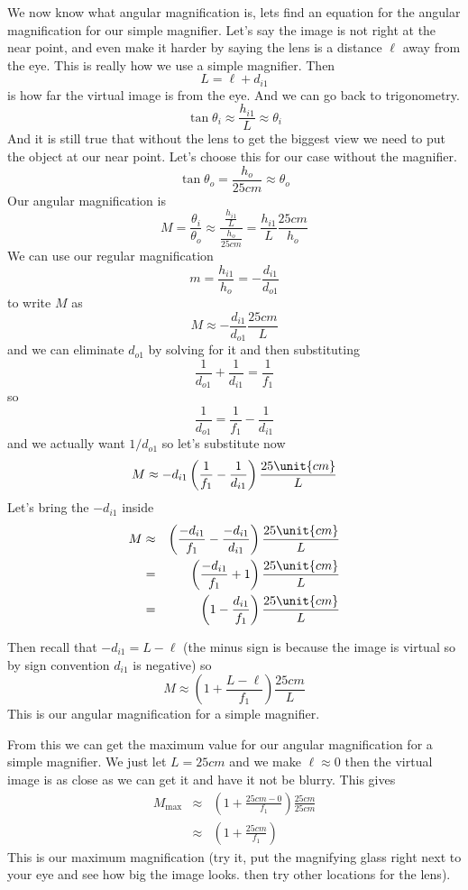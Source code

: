 \documentclass{article}
\begin{document}
We now know what angular magnification is, lets find an equation for the
angular magnification for our simple magnifier. Let's say the image is not right
at the near point, and even make it harder by saying the lens is a distance $%
\ell $ away from the eye. This is really how we use a simple magnifier. Then%
\[
L=\ell +d_{i1}
\]%
is how far the virtual image is from the eye. And we can go back to
trigonometry. 
\[
\tan \theta _{i}\approx \frac{h_{i1}}{L}\approx \theta _{i}
\]%
And it is still true that without the lens to get the biggest view we need
to put the object at our near point. Let's choose this for our case without
the magnifier. 
\[
\tan \theta _{o}=\frac{h_{o}}{25\unit{cm}}\approx \theta _{o}
\]%
Our angular magnification is 
\[
M=\frac{\theta _{i}}{\theta _{o}}\approx \frac{\frac{h_{i1}}{L}}{\frac{h_{o}%
}{25\unit{cm}}}=\frac{h_{i1}}{L}\frac{25\unit{cm}}{h_{o}}
\]%
We can use our regular magnification 
\[
m=\frac{h_{i1}}{h_{o}}=-\frac{d_{i1}}{d_{o1}}
\]%
to write $M$ as 
\[
M\approx -\frac{d_{i1}}{d_{o1}}\frac{25\unit{cm}}{L}
\]%
and we can eliminate $d_{o1}$ by solving for it and then substituting%
\[
\frac{1}{d_{o1}}+\frac{1}{d_{i1}}=\frac{1}{f_{1}}
\]%
so 
\[
\frac{1}{d_{o1}}=\frac{1}{f_{1}}-\frac{1}{d_{i1}}
\]%
and we actually want $1/d_{o1}$ so let's substitute now%
\[
M\approx -d_{i1}\left( \frac{1}{f_{1}}-\frac{1}{d_{i1}}\right) \frac{25\unit{%
cm}}{L}
\]%
Let's bring the $-d_{i1}$ inside%
\begin{eqnarray*}
M &\approx &\left( \frac{-d_{i1}}{f_{1}}-\frac{-d_{i1}}{d_{i1}}\right) \frac{%
25\unit{cm}}{L} \\
&=&\left( \frac{-d_{i1}}{f_{1}}+1\right) \frac{25\unit{cm}}{L} \\
&=&\left( 1-\frac{d_{i1}}{f_{1}}\right) \frac{25\unit{cm}}{L}
\end{eqnarray*}

Then recall that $-d_{i1}=L-\ell $ (the minus sign is because the image is
virtual so by sign convention $d_{i1}$ is negative) so 
\[
M\approx \left( 1+\frac{L-\ell }{f_{1}}\right) \frac{25\unit{cm}}{L}
\]%
This is our angular magnification for a simple magnifier.

From this we can get the maximum value for our angular magnification for a
simple magnifier. We just let $L=25\unit{cm}$ and we make $\ell \approx 0$
then the virtual image is as close as we can get it and have it not be
blurry. This gives 
\begin{eqnarray*}
M_{\max } &\approx &\left( 1+\frac{25\unit{cm}-0}{f_{1}}\right) \frac{25%
\unit{cm}}{25\unit{cm}} \\
&\approx &\left( 1+\frac{25\unit{cm}}{f_{1}}\right)
\end{eqnarray*}%
This is our maximum magnification (try it, put the magnifying glass right
next to your eye and see how big the image looks. then try other locations
for the lens).
\end{document}
